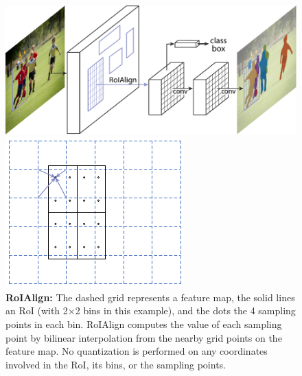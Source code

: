 \begin{figure}
\begin{minipage}{0.35\textwidth}
  \centering
  \includegraphics[width=1\linewidth]{figures/mask_rcnn/teaser}\vspace{2mm}
  \caption{The \textbf{Mask\hspace{0.1297em}R-CNN} framework for instance segmentation.}
\label{fig:teaser}
\end{minipage}\hspace{1.5em}
\begin{minipage}{0.6\textwidth}
  \begin{minipage}{0.365\linewidth}
  \includegraphics[width=\textwidth,trim={0 0 7.5mm 0},clip]{figures/mask_rcnn/roialign}
  \end{minipage}\hspace{0.5em}
  \begin{minipage}{0.605\linewidth}
  \caption{\footnotesize \textbf{RoIAlign:} The dashed grid represents a feature map, the solid lines an RoI (with 2$\times$2 bins in this example), and the dots the 4 sampling points in each bin. RoIAlign computes the value of each sampling point by bilinear interpolation from the nearby grid points on the feature map. No quantization is performed on any coordinates involved in the RoI, its bins, or the sampling points.}
  \label{fig:roialign}
  \end{minipage}
\end{minipage}
\end{figure}

